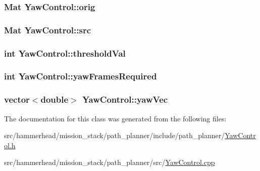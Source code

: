 \subsubsection[{\texorpdfstring{orig}{orig}}]{\setlength{\rightskip}{0pt plus 5cm}Mat Yaw\+Control\+::orig}\hypertarget{classYawControl_a462e793d0950d099f9744d72559f9471}{}\label{classYawControl_a462e793d0950d099f9744d72559f9471}
\subsubsection[{\texorpdfstring{src}{src}}]{\setlength{\rightskip}{0pt plus 5cm}Mat Yaw\+Control\+::src}\hypertarget{classYawControl_a02a206520541343b1a0eab7c6129acc3}{}\label{classYawControl_a02a206520541343b1a0eab7c6129acc3}
\subsubsection[{\texorpdfstring{threshold\+Val}{thresholdVal}}]{\setlength{\rightskip}{0pt plus 5cm}int Yaw\+Control\+::threshold\+Val}\hypertarget{classYawControl_aac657b91e9b950cf4087cbe045fc10e3}{}\label{classYawControl_aac657b91e9b950cf4087cbe045fc10e3}
\subsubsection[{\texorpdfstring{yaw\+Frames\+Required}{yawFramesRequired}}]{\setlength{\rightskip}{0pt plus 5cm}int Yaw\+Control\+::yaw\+Frames\+Required}\hypertarget{classYawControl_a52fc55d1751f266d7cffb7001942a012}{}\label{classYawControl_a52fc55d1751f266d7cffb7001942a012}
\subsubsection[{\texorpdfstring{yaw\+Vec}{yawVec}}]{\setlength{\rightskip}{0pt plus 5cm}vector$<$double$>$ Yaw\+Control\+::yaw\+Vec}\hypertarget{classYawControl_a1bbb4b2ad414fc1e5a2edbde811bd7fe}{}\label{classYawControl_a1bbb4b2ad414fc1e5a2edbde811bd7fe}


The documentation for this class was generated from the following files\+:\begin{DoxyCompactItemize}
\item 
src/hammerhead/mission\+\_\+stack/path\+\_\+planner/include/path\+\_\+planner/\hyperlink{YawControl_8h}{Yaw\+Control.\+h}\item 
src/hammerhead/mission\+\_\+stack/path\+\_\+planner/src/\hyperlink{YawControl_8cpp}{Yaw\+Control.\+cpp}\end{DoxyCompactItemize}
